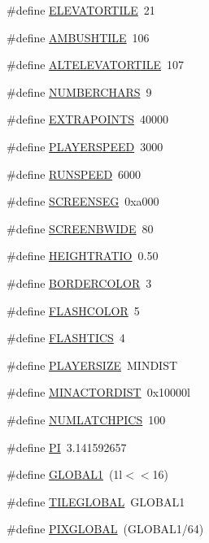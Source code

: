 \begin{DoxyCompactItemize}
\item 
\#define \hyperlink{WL__DEF_8H_a90f8bac9770af7896d55a94b41516227}{ELEVATORTILE}~21
\item 
\#define \hyperlink{WL__DEF_8H_a3925f75d61e8ed0dfde6b2a784aaec6c}{AMBUSHTILE}~106
\item 
\#define \hyperlink{WL__DEF_8H_a4a44602b6d623296dcbf2dc803e493b7}{ALTELEVATORTILE}~107
\item 
\#define \hyperlink{WL__DEF_8H_ab1b4c7ec4d259982decae5d03ffa2ca6}{NUMBERCHARS}~9
\item 
\#define \hyperlink{WL__DEF_8H_a14d4ed27110b40ff142c3f4be97135a2}{EXTRAPOINTS}~40000
\item 
\#define \hyperlink{WL__DEF_8H_a2ffe160306e93f60aad0701732acecc8}{PLAYERSPEED}~3000
\item 
\#define \hyperlink{WL__DEF_8H_a76d14f7b769231535242ac32916ebd5c}{RUNSPEED}~6000
\item 
\#define \hyperlink{WL__DEF_8H_ae453594b95ad6a2675c3f583a95a9ef5}{SCREENSEG}~0xa000
\item 
\#define \hyperlink{WL__DEF_8H_a9d77b150659bac02b1dad2493a26f997}{SCREENBWIDE}~80
\item 
\#define \hyperlink{WL__DEF_8H_a44c330a526c90af7338c21adcc69fa63}{HEIGHTRATIO}~0.50
\item 
\#define \hyperlink{WL__DEF_8H_a22eab88aba99b04969b4074b344670b6}{BORDERCOLOR}~3
\item 
\#define \hyperlink{WL__DEF_8H_a093326590ebb9859efb3670bb5b0c663}{FLASHCOLOR}~5
\item 
\#define \hyperlink{WL__DEF_8H_ac6711e6f150549c8d00afb424cf1e752}{FLASHTICS}~4
\item 
\#define \hyperlink{WL__DEF_8H_a2111affdcef210aa7fed2f423aaf25fc}{PLAYERSIZE}~MINDIST
\item 
\#define \hyperlink{WL__DEF_8H_a153314aeb647c7cbf763ab4504aea1e9}{MINACTORDIST}~0x10000l
\item 
\#define \hyperlink{WL__DEF_8H_a58867ea52d9495b87bc4afa660b92e8a}{NUMLATCHPICS}~100
\item 
\#define \hyperlink{WL__DEF_8H_a598a3330b3c21701223ee0ca14316eca}{PI}~3.141592657
\item 
\#define \hyperlink{WL__DEF_8H_af76b48af5c51e9a7756d4842ad51719e}{GLOBAL1}~(1l$<$$<$16)
\item 
\#define \hyperlink{WL__DEF_8H_a8efa5750119f7544ae4805544b79fe69}{TILEGLOBAL}~GLOBAL1
\item 
\#define \hyperlink{WL__DEF_8H_a989bdb548363bcaca8616280e647424f}{PIXGLOBAL}~(GLOBAL1/64)
$$
\end{DoxyCompactItemize}
